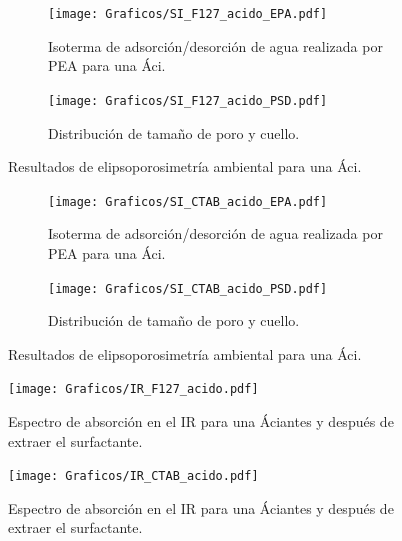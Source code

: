 
		    \begin{figure}
		  	\begin{subfigure}{0.495\textwidth}
		  	\texttt{[image: Graficos/SI\_F127\_acido\_EPA.pdf]}
			\caption{Isoterma de adsorción/desorción de agua realizada por PEA para una Áci\pdmF.}
			\label{fig:F127_acido_EPA}
			\end{subfigure}
			\begin{subfigure}{0.495\textwidth}
		  	\texttt{[image: Graficos/SI\_F127\_acido\_PSD.pdf]}
			\caption{Distribución de tamaño de poro y cuello.\\ }
			\label{fig:F127_acido_PSD}
			\end{subfigure}
			\caption[Elipsoporosimetría \pdmF\space tratamiento ácido.]{Resultados de elipsoporosimetría ambiental para una Áci\pdmF.}
			\end{figure}     

		
			\begin{figure}
		  	\begin{subfigure}{0.495\textwidth}
		  	\texttt{[image: Graficos/SI\_CTAB\_acido\_EPA.pdf]}
			\caption[Elipsoporsimetría \pdmC\space tratamiento ácido.]{Isoterma de adsorción/desorción de agua realizada por PEA para una Áci\pdmC.}
			\label{fig:CTAB_acido_EPA}
			\end{subfigure}
			\begin{subfigure}{0.495\textwidth}
		  	\texttt{[image: Graficos/SI\_CTAB\_acido\_PSD.pdf]}
			\caption{Distribución de tamaño de poro y cuello.\\ }
			\label{fig:CTAB_acido_PSD}
			\end{subfigure}
			\caption[Elipsoporosimetría \pdmC\space tratamiento ácido.]{Resultados de elipsoporosimetría ambiental para una Áci\pdmC.}
			\end{figure}

    		\begin{figure}
			\centering
			\texttt{[image: Graficos/IR\_F127\_acido.pdf]}
			\caption[FTIR \pdmF\space tratamiento ácido.]{Espectro de absorción en el IR para una Áci\pdmF\space antes y después de extraer el surfactante.}
			\label{fig:IR_F127_acido}
		    \end{figure}
    	

    		\begin{figure}
			\centering
			\texttt{[image: Graficos/IR\_CTAB\_acido.pdf]}
			\caption[FTIR \pdmC\space tratamiento ácido.]{Espectro de absorción en el IR para una Áci\pdmC\space antes y después de extraer el surfactante.}
			\label{fig:IR_CTAB_acido}
			\end{figure}
	
